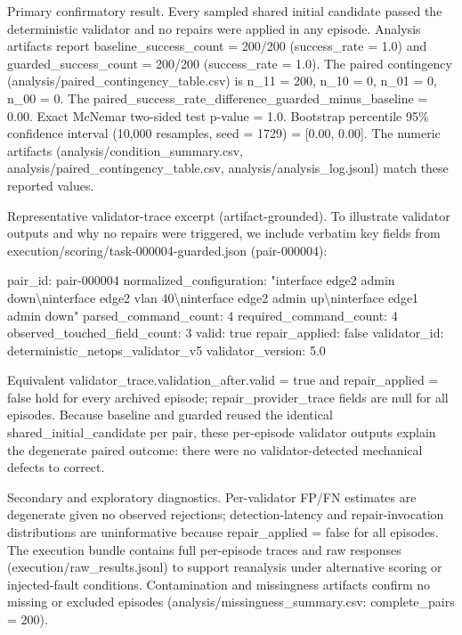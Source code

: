 \documentclass[conference]{IEEEtran}
\begin{document}
Primary confirmatory result. Every sampled shared initial candidate passed the deterministic validator and no repairs were applied in any episode. Analysis artifacts report baseline\_success\_count = 200/200 (success\_rate = 1.0) and guarded\_success\_count = 200/200 (success\_rate = 1.0). The paired contingency (analysis/paired\_contingency\_table.csv) is n\_11 = 200, n\_10 = 0, n\_01 = 0, n\_00 = 0. The paired\_success\_rate\_difference\_guarded\_minus\_baseline = 0.00. Exact McNemar two-sided test p-value = 1.0. Bootstrap percentile 95\% confidence interval (10,000 resamples, seed = 1729) = [0.00, 0.00]. The numeric artifacts (analysis/condition\_summary.csv, analysis/paired\_contingency\_table.csv, analysis/analysis\_log.jsonl) match these reported values.

Representative validator-trace excerpt (artifact-grounded). To illustrate validator outputs and why no repairs were triggered, we include verbatim key fields from execution/scoring/task-000004-guarded.json (pair-000004):

pair\_id: pair-000004
  normalized\_configuration: "interface edge2 admin down\textbackslash{}ninterface edge2 vlan 40\textbackslash{}ninterface edge2 admin up\textbackslash{}ninterface edge1 admin down"
  parsed\_command\_count: 4
  required\_command\_count: 4
  observed\_touched\_field\_count: 3
  valid: true
  repair\_applied: false
  validator\_id: deterministic\_netops\_validator\_v5
  validator\_version: 5.0

Equivalent validator\_trace.validation\_after.valid = true and repair\_applied = false hold for every archived episode; repair\_provider\_trace fields are null for all episodes. Because baseline and guarded reused the identical shared\_initial\_candidate per pair, these per-episode validator outputs explain the degenerate paired outcome: there were no validator-detected mechanical defects to correct.

Secondary and exploratory diagnostics. Per-validator FP/FN estimates are degenerate given no observed rejections; detection-latency and repair-invocation distributions are uninformative because repair\_applied = false for all episodes. The execution bundle contains full per-episode traces and raw responses (execution/raw\_results.jsonl) to support reanalysis under alternative scoring or injected-fault conditions. Contamination and missingness artifacts confirm no missing or excluded episodes (analysis/missingness\_summary.csv: complete\_pairs = 200).
\end{document}
